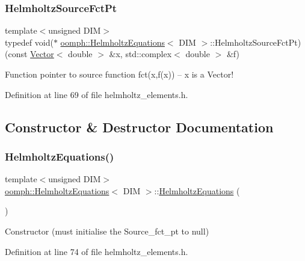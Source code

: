 \subsubsection{\texorpdfstring{Helmholtz\+Source\+Fct\+Pt}{HelmholtzSourceFctPt}}
{\footnotesize\ttfamily template$<$unsigned D\+IM$>$ \\
typedef void($\ast$ \hyperlink{classoomph_1_1HelmholtzEquations}{oomph\+::\+Helmholtz\+Equations}$<$ D\+IM $>$\+::Helmholtz\+Source\+Fct\+Pt) (const \hyperlink{classoomph_1_1Vector}{Vector}$<$ double $>$ \&x, std\+::complex$<$ double $>$ \&f)}



Function pointer to source function fct(x,f(x)) -- x is a Vector! 



Definition at line 69 of file helmholtz\+\_\+elements.\+h.



\subsection{Constructor \& Destructor Documentation}
\mbox{\label{classoomph_1_1HelmholtzEquations_a49deec1f79afba8b847da1abf50049a3}} 
\subsubsection{\texorpdfstring{Helmholtz\+Equations()}{HelmholtzEquations()}\hspace{0.1cm}{\footnotesize\ttfamily [1/2]}}
{\footnotesize\ttfamily template$<$unsigned D\+IM$>$ \\
\hyperlink{classoomph_1_1HelmholtzEquations}{oomph\+::\+Helmholtz\+Equations}$<$ D\+IM $>$\+::\hyperlink{classoomph_1_1HelmholtzEquations}{Helmholtz\+Equations} (\begin{DoxyParamCaption}{ }\end{DoxyParamCaption})\hspace{0.3cm}{\ttfamily [inline]}}



Constructor (must initialise the Source\+\_\+fct\+\_\+pt to null) 



Definition at line 74 of file helmholtz\+\_\+elements.\+h.

